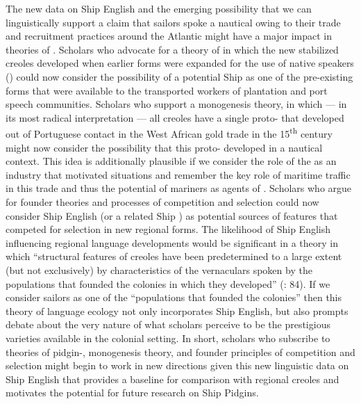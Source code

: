 The new data on Ship English and the emerging possibility that we can linguistically support a claim that sailors spoke a nautical  owing to their trade and recruitment practices around the Atlantic might have a major impact in theories of . Scholars who advocate for a theory of  in which the new stabilized creoles developed when earlier  forms were expanded for the use of native speakers (\citealt{Holm1988}) could now consider the possibility of a potential Ship  as one of the pre-existing forms that were available to the transported workers of plantation and port speech communities. Scholars who support a monogenesis theory, in which — in its most radical interpretation — all creoles have a single proto- that developed out of Portuguese contact in the West African gold trade in the 15\textsuperscript{th} century might now consider the possibility that this proto- developed in a nautical context. This idea is additionally plausible if we consider the role of the  as an industry that motivated  situations and remember the key role of maritime traffic in this trade and thus the potential of mariners as agents of . Scholars who argue for founder theories and processes of competition and selection \citep{Mufwene1996} could now consider Ship English (or a related Ship ) as potential sources of features that competed for selection in new regional forms. The likelihood of Ship English influencing regional language developments would be significant in a theory in which “structural features of creoles have been predetermined to a large extent (but not exclusively) by characteristics of the vernaculars spoken by the populations that founded the colonies in which they developed” (\citealt{Mufwene1996}: 84). If we consider sailors as one of the “populations that founded the colonies” then this theory of language ecology not only incorporates Ship English, but also prompts debate about the very nature of what scholars perceive to be the prestigious  varieties available in the colonial setting. In short, scholars who subscribe to theories of pidgin-, monogenesis theory, and founder principles of competition and selection might begin to work in new directions given this new linguistic data on Ship English that provides a baseline for comparison with regional creoles and motivates the potential for future research on Ship Pidgins. 

